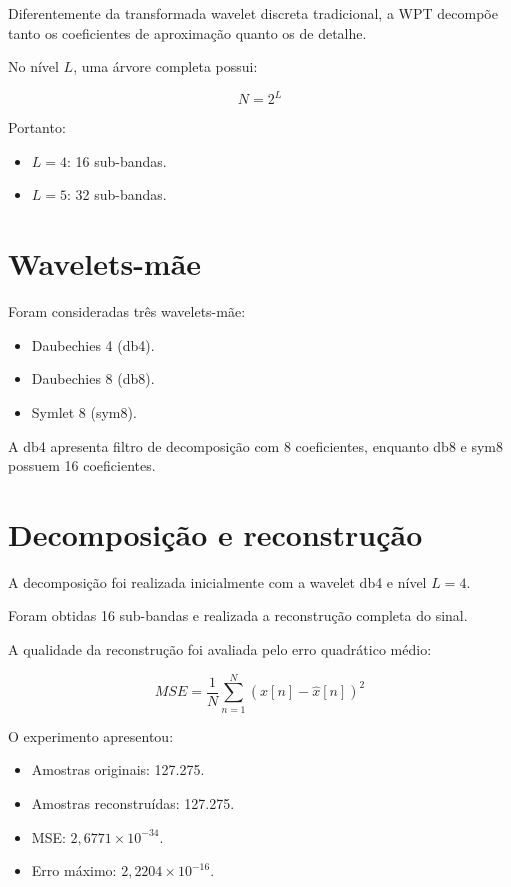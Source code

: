 \documentclass[12pt,a4paper]{article}
\begin{document}
Diferentemente da transformada wavelet discreta
tradicional, a WPT decompõe tanto os coeficientes
de aproximação quanto os de detalhe.

No nível $L$, uma árvore completa possui:

\begin{equation}
N = 2^L
\end{equation}

Portanto:

\begin{itemize}
\item $L=4$: 16 sub-bandas.
\item $L=5$: 32 sub-bandas.
\end{itemize}

\section{Wavelets-mãe}

Foram consideradas três wavelets-mãe:

\begin{itemize}
\item Daubechies 4 (db4).
\item Daubechies 8 (db8).
\item Symlet 8 (sym8).
\end{itemize}

A db4 apresenta filtro de decomposição com
8 coeficientes, enquanto db8 e sym8 possuem
16 coeficientes.

\section{Decomposição e reconstrução}

A decomposição foi realizada inicialmente com
a wavelet db4 e nível $L=4$.

Foram obtidas 16 sub-bandas e realizada a
reconstrução completa do sinal.

A qualidade da reconstrução foi avaliada pelo
erro quadrático médio:

\begin{equation}
MSE = \frac{1}{N}
\sum_{n=1}^{N}
(x[n]-\hat{x}[n])^2
\end{equation}

O experimento apresentou:

\begin{itemize}
\item Amostras originais: 127.275.
\item Amostras reconstruídas: 127.275.
\item MSE: $2{,}6771 \times 10^{-34}$.
\item Erro máximo: $2{,}2204 \times 10^{-16}$.
\end{itemize}
\end{document}
